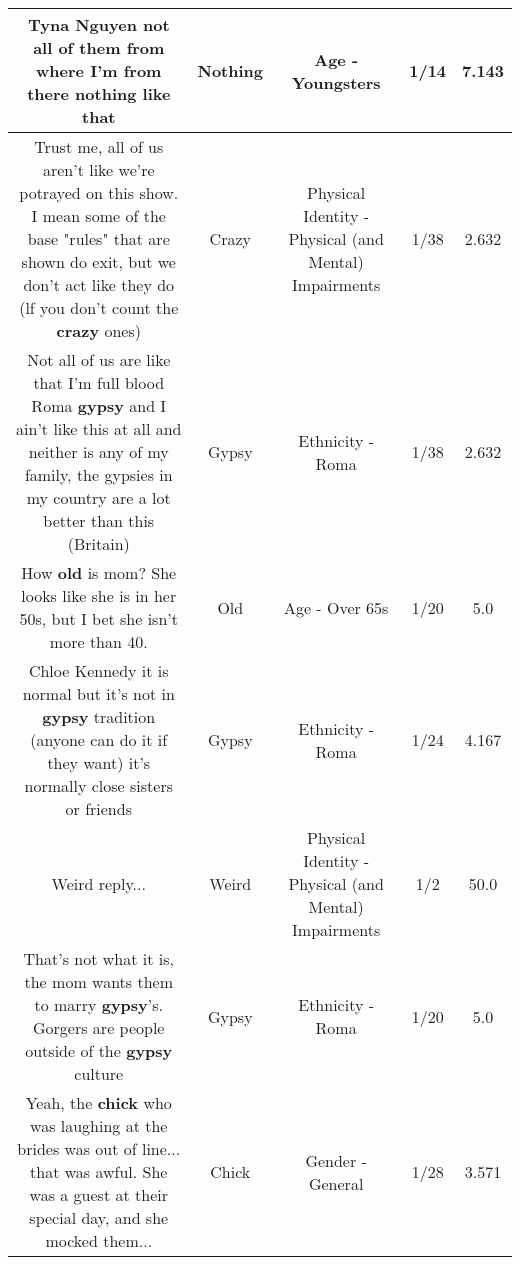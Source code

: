 \documentclass[11pt]{article}
\newlength\mylength
\begin{document}
\begin{center}
\begin{longtable}{|C{.65\mylength}|C{.30\mylength}|C{.12\mylength}|C{.12\mylength}|C{.12\mylength}|}
  \small Tyna Nguyen not all of them from where I'm from there \textbf{nothing} like that\normalsize   & Nothing & Age - Youngsters & 1/14 & 7.143 \\  \hline
  \small Trust me, all of us aren't like we're potrayed on this show. I mean some of the base "rules" that are shown do exit, but we don't act like they do (lf you don't count the \textbf{crazy} ones)\normalsize   & Crazy & Physical Identity - Physical (and Mental) Impairments & 1/38 & 2.632 \\  \hline
  \small Not all of us are like that I'm full blood Roma \textbf{gypsy} and I ain't like this at all and neither is any of my family, the gypsies in my country are a lot better than this (Britain)\normalsize   & Gypsy & Ethnicity - Roma & 1/38 & 2.632 \\  \hline
  \small How \textbf{old} is mom?  She looks like she is in her 50s, but I bet she isn't more than 40.\normalsize   & Old & Age - Over 65s & 1/20 & 5.0 \\  \hline
  \small Chloe Kennedy it is normal but it's not in \textbf{gypsy} tradition (anyone can do it if they want) it's normally close sisters or friends\normalsize   & Gypsy & Ethnicity - Roma & 1/24 & 4.167 \\  \hline
  \small Weird reply...\normalsize   & Weird & Physical Identity - Physical (and Mental) Impairments & 1/2 & 50.0 \\  \hline
  \small That's not what it is, the mom wants them to marry \textbf{gypsy}'s. Gorgers are people outside of the \textbf{gypsy} culture\normalsize   & Gypsy & Ethnicity - Roma & 1/20 & 5.0 \\  \hline
  \small Yeah, the \textbf{chick} who was laughing at the brides was out of line... that was awful. She was a guest at their special day, and she mocked them...\normalsize   & Chick & Gender - General & 1/28 & 3.571 \\  \hline

\end{longtable}
\end{center}
\end{document}
